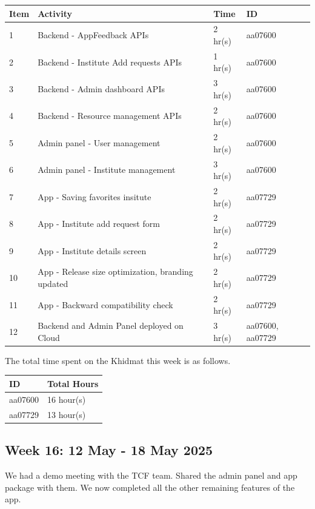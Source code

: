 \documentclass[12pt,a4paper]{article}
\begin{document}
\begin{center}
    \bigskip
    \begin{tabular}{|l|l|l|l|}
        \hline
        Item 	& Activity & Time & ID \\\hline\hline
        1	& Backend - AppFeedback APIs & 2 hr(s) & aa07600 \\\hline
        2	& Backend - Institute Add requests APIs & 1 hr(s) & aa07600 \\\hline
        3	& Backend - Admin dashboard APIs & 3 hr(s) & aa07600 \\\hline
        4	& Backend - Resource management APIs & 2 hr(s) & aa07600 \\\hline
        5	& Admin panel - User management & 2 hr(s) & aa07600 \\\hline
        6	& Admin panel - Institute management & 3 hr(s) & aa07600 \\\hline\hline
        7	& App - Saving favorites insitute & 2 hr(s) & aa07729 \\\hline
        8	& App - Institute add request form & 2 hr(s) & aa07729 \\\hline
        9	& App - Institute details screen & 2 hr(s) & aa07729 \\\hline
        10  & App - Release size optimization, branding updated & 2 hr(s) & aa07729 \\\hline
        11  & App - Backward compatibility check & 2 hr(s) & aa07729 \\\hline\hline
        12  & Backend and Admin Panel deployed on Cloud & 3 hr(s) & aa07600, aa07729 \\\hline
    \end{tabular}

    \bigskip
    The total time spent on the Khidmat this week is as follows.

    \bigskip
    \begin{tabular}{|l|l|}
        \hline
        ID & Total Hours\\\hline\hline
        aa07600 & 16 hour(s)\\\hline
        aa07729 & 13 hour(s)\\\hline
    \end{tabular}
\end{center}

\newpage

\subsection{Week 16: 12 May - 18 May 2025}
We had a demo meeting with the TCF team. Shared the admin panel and app package with them. We now completed all the other remaining features of the app.
\end{document}
